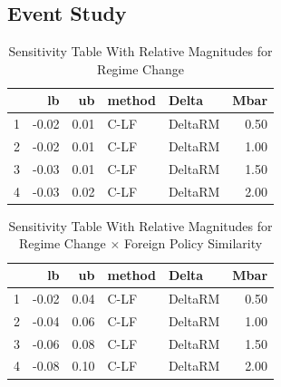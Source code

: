 \documentclass[12pt,a4paper]{article}
\begin{document}
\begin{appendices}
\subsection{Event Study}\label{app5}
\begin{table}[!hptb]
\centering
\begin{tabular}{rrrllr}
  \hline
 & lb & ub & method & Delta & Mbar \\ 
  \hline
1 & -0.02 & 0.01 & C-LF & DeltaRM & 0.50 \\ 
  2 & -0.02 & 0.01 & C-LF & DeltaRM & 1.00 \\ 
  3 & -0.03 & 0.01 & C-LF & DeltaRM & 1.50 \\ 
  4 & -0.03 & 0.02 & C-LF & DeltaRM & 2.00 \\ 
   \hline
\end{tabular}
    \caption{Sensitivity Table With Relative Magnitudes for Regime Change}
    \label{tab:rg}
\end{table}
\begin{table}[!hptb]
\centering
\begin{tabular}{rrrllr}
  \hline
 & lb & ub & method & Delta & Mbar \\ 
  \hline
1 & -0.02 & 0.04 & C-LF & DeltaRM & 0.50 \\ 
  2 & -0.04 & 0.06 & C-LF & DeltaRM & 1.00 \\ 
  3 & -0.06 & 0.08 & C-LF & DeltaRM & 1.50 \\ 
  4 & -0.08 & 0.10 & C-LF & DeltaRM & 2.00 \\ 
   \hline
\end{tabular}
    \caption{Sensitivity Table With Relative Magnitudes for Regime Change $\times$ Foreign Policy Similarity}
    \label{tab:fpsi}
\end{table}


\end{appendices}
\end{document}
